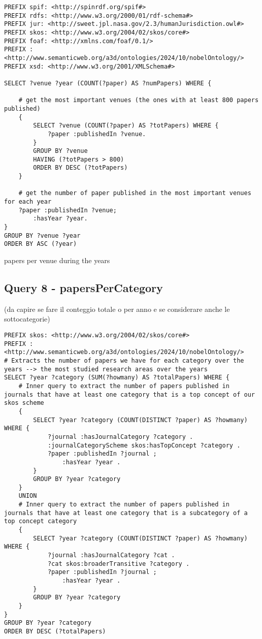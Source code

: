 \documentclass{article}
\begin{document}
\begin{lstlisting}
PREFIX spif: <http://spinrdf.org/spif#>
PREFIX rdfs: <http://www.w3.org/2000/01/rdf-schema#>
PREFIX jur: <http://sweet.jpl.nasa.gov/2.3/humanJurisdiction.owl#>
PREFIX skos: <http://www.w3.org/2004/02/skos/core#>
PREFIX foaf: <http://xmlns.com/foaf/0.1/>
PREFIX : <http://www.semanticweb.org/a3d/ontologies/2024/10/nobelOntology/>
PREFIX xsd: <http://www.w3.org/2001/XMLSchema#>

SELECT ?venue ?year (COUNT(?paper) AS ?numPapers) WHERE {

    # get the most important venues (the ones with at least 800 papers published)
    {
        SELECT ?venue (COUNT(?paper) AS ?totPapers) WHERE {
            ?paper :publishedIn ?venue.
        }
        GROUP BY ?venue
        HAVING (?totPapers > 800)
        ORDER BY DESC (?totPapers)
    }

    # get the number of paper published in the most important venues for each year
    ?paper :publishedIn ?venue;
        :hasYear ?year.
}
GROUP BY ?venue ?year
ORDER BY ASC (?year)    
\end{lstlisting}

papers per venue during the years

\subsection*{Query 8 - papersPerCategory}
(da capire se fare il conteggio totale o per anno e se considerare anche le sottocategorie)

\begin{lstlisting}
PREFIX skos: <http://www.w3.org/2004/02/skos/core#>
PREFIX : <http://www.semanticweb.org/a3d/ontologies/2024/10/nobelOntology/>
# Extracts the number of papers we have for each category over the years --> the most studied research areas over the years
SELECT ?year ?category (SUM(?howmany) AS ?totalPapers) WHERE {
    # Inner query to extract the number of papers published in journals that have at least one category that is a top concept of our skos scheme
    {
        SELECT ?year ?category (COUNT(DISTINCT ?paper) AS ?howmany) WHERE {
            ?journal :hasJournalCategory ?category .
            :journalCategoryScheme skos:hasTopConcept ?category .
            ?paper :publishedIn ?journal ;
                :hasYear ?year .
        } 
        GROUP BY ?year ?category
    }
    UNION
    # Inner query to extract the number of papers published in journals that have at least one category that is a subcategory of a top concept category
    {
        SELECT ?year ?category (COUNT(DISTINCT ?paper) AS ?howmany) WHERE {
            ?journal :hasJournalCategory ?cat .
            ?cat skos:broaderTransitive ?category .
            ?paper :publishedIn ?journal ;
                :hasYear ?year .
        } 
        GROUP BY ?year ?category
    }
} 
GROUP BY ?year ?category
ORDER BY DESC (?totalPapers)    
\end{lstlisting}
\end{document}
